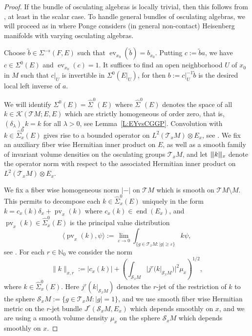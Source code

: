 \documentclass[reqno,12pt]{amsart}
\DeclareMathOperator{\pv}{pv}
\DeclareMathOperator{\ev}{ev}
\newcommand\bbb{|\mkern-2mu|\mkern-2mu|}
\DeclareMathOperator{\eend}{end}
\newcommand\N{\mathbb N}
\theoremstyle{plain}
\theoremstyle{definition}
\begin{document}
\begin{proof}
If the bundle of osculating algebras is locally trivial, then this follows from \cite{CGGP92}, at least in the scalar case.
To handle general bundles of osculating algebras, we will proceed as in \cite[Section~3.3.3]{P08} where Ponge considers (in general non-contact) Heisenberg manifolds with varying osculating algebras.


Choose $\tilde b\in\Sigma^{-s}(F,E)$ such that $\ev_{x_0}(\tilde b)=b_{x_0}$.
Putting $c:=\tilde ba$, we have $c\in\Sigma^0(E)$ and $\ev_{x_0}(c)=1$.
It suffices to find an open neighborhood $U$ of $x_0$ in $M$ such that $c|_U$ is invertible in $\Sigma^0(E|_U)$, for then $b:=c|_U^{-1}\tilde b$ is the desired local left inverse of $a$.

We will identify $\Sigma^0(E)=\hat\Sigma^0(E)$ where $\hat\Sigma^0(E)$ denotes the space of all $k\in\mathcal K(\mathcal TM;E,E)$ which are strictly homogeneous of order zero, that is, $(\delta_\lambda)_*k=k$ for all $\lambda>0$, see Lemma~\ref{L:EYvsCGGP}.
Convolution with $k\in\hat\Sigma^0_x(E)$ gives rise to a bounded operator on $L^2(\mathcal T_xM)\otimes E_x$, see \cite[Theorem~6.19]{FS82}.
We fix an auxiliary fiber wise Hermitian inner product on $E$, as well as a smooth family of invariant volume densities on the osculating groups $\mathcal T_xM$, and let $\bbb k\bbb_x$ denote the operator norm with respect to the associated Hermitian inner product on $L^2(\mathcal T_xM)\otimes E_x$.


We fix a fiber wise homogeneous norm $|-|$ on $\mathcal TM$ which is smooth on $\mathcal TM\setminus M$.
This permits to decompose each $k\in\hat\Sigma^0_x(E)$ uniquely in the form $k=c_x(k)\delta_x+\pv_x(k)$ where $c_x(k)\in\eend(E_x)$, and $\pv_x(k)\in\hat\Sigma^0_x(E)$ is the principal value distribution
$$
\langle\pv_x(k),\psi\rangle:=\lim_{\varepsilon\to0}\int_{\{g\in\mathcal T_xM:|g|\geq\varepsilon\}}k\psi,
$$
see \cite[Proposition~6.13]{FS82}.
For each $r\in\N_0$ we consider the norm
$$
\|k\|_{x,r}:=|c_x(k)|+\left(\int_{\mathcal S_xM}|j^r(k|_{\mathcal S_xM})|^2\mu_x\right)^{1/2},
$$
where $k\in\hat\Sigma^0_x(E)$.
Here $j^r(k|_{\mathcal S_xM})$ denotes the $r$-jet of the restriction of $k$ to the sphere $\mathcal S_xM:=\{g\in\mathcal T_xM:|g|=1\}$, and we use smooth fiber wise Hermitian metric on the $r$-jet bundle $J^r(\mathcal S_xM,E_x)$ which depends smoothly on $x$, and we are using a smooth volume density $\mu_x$ on the sphere $\mathcal S_xM$ which depends smoothly on $x$.



\end{proof}
\end{document}
